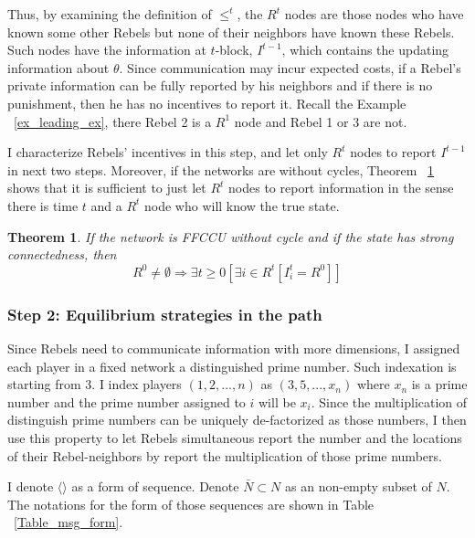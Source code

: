 \documentclass[12pt,letter]{article}
\newtheorem{theorem}{Theorem}
\theoremstyle{definition}
\theoremstyle{remark}
\theoremstyle{claim}
\begin{document}
Thus, by examining the definition of $\leq^t$, the $R^t$ nodes are those nodes who have known some other Rebels but none of their neighbors have known these Rebels. Such nodes have the information at $t$-block, $I^{t-1}$, which contains the updating information about $\theta$. Since communication may incur expected costs, if a Rebel's private information can be fully reported by his neighbors and if there is no punishment, then he has no incentives to report it. Recall the Example ~\ref{ex_leading_ex}, there Rebel 2 is a $R^1$ node and Rebel 1 or 3 are not.

I characterize Rebels' incentives in this step, and let only $R^t$ nodes to report $I^{t-1}$ in next two steps. Moreover, if the networks are without cycles, Theorem ~\ref{lemma_empty} shows that it is sufficient to just let $R^t$ nodes to report information in the sense there is time $t$ and a $R^t$ node who will know the true state. 
\begin{theorem}
\label{lemma_empty}
If the network is FFCCU without cycle and if the state has strong connectedness, then 
\[R^0\neq \emptyset \Rightarrow \exists t\geq 0[\exists i\in R^t[I^t_i=R^0]]\]
\end{theorem}



\subsubsection{Step 2: Equilibrium strategies in the path}


Since Rebels need to communicate information with more dimensions, I assigned each player in a fixed network a distinguished prime number. Such indexation is starting from $3$. I index players $(1,2,...,n)$ as $(3,5,...,x_n)$ where $x_n$ is a prime number and the prime number assigned to $i$ will be $x_i$. Since the multiplication of distinguish prime numbers can be uniquely de-factorized as those numbers, I then use this property to let Rebels simultaneous report the number and the locations of their Rebel-neighbors by report the multiplication of those prime numbers.

I denote $\langle\rangle$ as a form of sequence. Denote $\bar{N}\subset N$ as an non-empty subset of $N$. The notations for the form of those sequences are shown in Table ~\ref{Table_msg_form}. 
\end{document}
